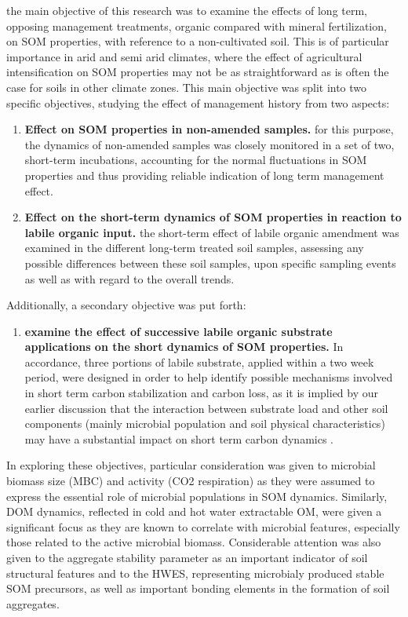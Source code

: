 \documentclass[12pt]{report}
\makeatletter
\newcounter{saveenumerate}
\newcommand{\numintertext}[1]{%
		\setcounter{saveenumerate}{\value{enum\romannumeral\the\@enumdepth}}
	\end{enumerate}
	#1
	\begin{enumerate}
		\setcounter{enum\romannumeral\the\@enumdepth}{\value{saveenumerate}}%
	}
\makeatother
\begin{document}
	the main objective of this research was to examine the effects of long term, opposing management treatments, organic compared with mineral fertilization, on SOM properties,  with reference to a non-cultivated soil. This is of particular importance in arid and semi arid climates, where the effect of agricultural intensification on SOM properties may not be as straightforward as is often the case for soils in other climate zones.
	This main objective was split into two specific objectives, studying the effect of management history from two aspects: 
	\begin{enumerate}
		\item \textbf{Effect on SOM properties in non-amended samples.} for this purpose, the dynamics of non-amended samples was closely monitored in a set of two, short-term incubations, accounting for the normal fluctuations in SOM properties and thus providing reliable indication of long term management effect. 
		\item \textbf{Effect on the short-term dynamics of SOM properties in reaction to labile organic input.} the short-term effect of labile organic amendment was examined in the different long-term treated soil samples, assessing any possible differences between these soil samples, upon specific sampling events as well as with regard to the overall trends.
		
	\numintertext{Additionally, a secondary objective was put forth:}

		\item \textbf{examine the effect of successive labile organic substrate applications on the short dynamics of SOM properties.} In accordance, three portions of labile substrate, applied within a two week period, were designed in  order to help identify possible mechanisms involved in short term carbon stabilization and carbon loss, as it is implied by our earlier discussion that the interaction between substrate load and other soil components (mainly microbial population and soil physical characteristics) may have a substantial impact on short term carbon dynamics .
	\end{enumerate}
	In exploring these objectives, particular consideration was given to microbial biomass size (MBC)  and activity (CO2 respiration) as they were assumed to express the essential role of microbial populations in SOM dynamics. Similarly, DOM dynamics, reflected in cold and hot water extractable OM, were given a significant focus as they are known to correlate with microbial features, especially those related to the active microbial biomass.  Considerable attention was also given to the aggregate stability parameter as an important indicator of soil structural features and to the HWES, representing microbialy produced stable SOM precursors, as well as important bonding elements in the formation of soil aggregates.  
\end{document}
